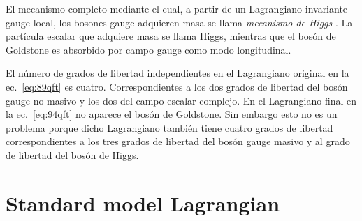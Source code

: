 \begin{frame}
El mecanismo completo mediante el cual, a partir de un Lagrangiano invariante gauge local, los bosones gauge adquieren masa se llama \emph{mecanismo de Higgs} \cite{Higgs:1964pj}. La partícula escalar que adquiere masa se llama Higgs, mientras que el bosón de Goldstone es absorbido por campo gauge como modo longitudinal. 

El número de grados de libertad independientes en el Lagrangiano original en la ec.~\eqref{eq:89qft} es cuatro. Correspondientes a los dos grados de libertad del bosón gauge no masivo y los dos del campo escalar complejo. En el Lagrangiano final en la ec.~\eqref{eq:94qft} no aparece el bosón de Goldstone. Sin embargo esto no es un problema porque dicho Lagrangiano también tiene cuatro grados de libertad correspondientes a  los tres grados de libertad del bosón gauge masivo y al grado de libertad del bosón de Higgs. 

\end{frame}

\section{Standard model Lagrangian}
\label{sec:stand-model-lagr}

